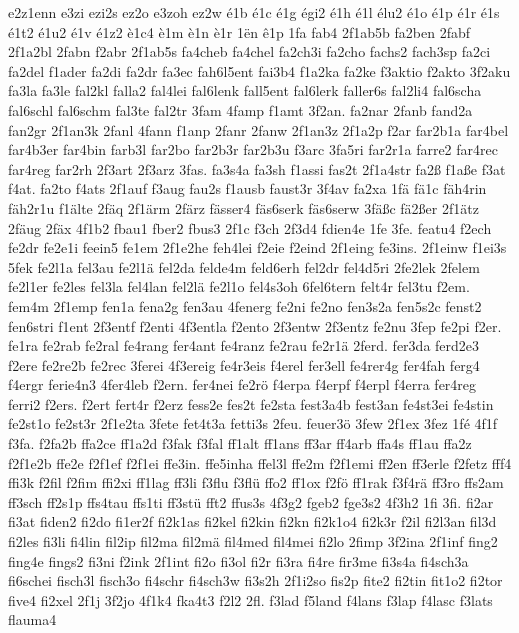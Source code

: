 {e2z1enn
e3zi
ezi2s
ez2o
e3zoh
ez2w
é1b
é1c
é1g
égi2
é1h
é1l
élu2
é1o
é1p
é1r
é1s
é1t2
é1u2
é1v
é1z2
è1c4
è1m
è1n
è1r
1ën
ê1p
1fa
fab4
2f1ab5b
fa2ben
2fabf
2f1a2bl
2fabn
f2abr
2f1ab5s
fa4cheb
fa4chel
fa2ch3i
fa2cho
fachs2
fach3sp
fa2ci
fa2del
f1ader
fa2di
fa2dr
fa3ec
fah6l5ent
fai3b4
f1a2ka
fa2ke
f3aktio
f2akto
3f2aku
fa3la
fa3le
fal2kl
falla2
fal4lei
fal6lenk
fall5ent
fal6lerk
faller6s
fal2li4
fal6scha
fal6schl
fal6schm
fal3te
fal2tr
3fam
4famp
f1amt
3f2an.
fa2nar
2fanb
fand2a
fan2gr
2f1an3k
2fanl
4fann
f1anp
2fanr
2fanw
2f1an3z
2f1a2p
f2ar
far2b1a
far4bel
far4b3er
far4bin
farb3l
far2bo
far2b3r
far2b3u
f3arc
3fa5ri
far2r1a
farre2
far4rec
far4reg
far2rh
2f3art
2f3arz
3fas.
fa3s4a
fa3sh
f1assi
fas2t
2f1a4str
fa2ß
f1aße
f3at
f4at.
fa2to
f4ats
2f1auf
f3aug
fau2s
f1ausb
faust3r
3f4av
fa2xa
1fä
fä1c
fäh4rin
fäh2r1u
f1älte
2fäq
2f1ärm
2färz
fässer4
fäs6serk
fäs6serw
3fäßc
fä2ßer
2f1ätz
2fäug
2fäx
4f1b2
fbau1
fber2
fbus3
2f1c
f3ch
2f3d4
fdien4e
1fe
3fe.
featu4
f2ech
fe2dr
fe2e1i
feein5
fe1em
2f1e2he
feh4lei
f2eie
f2eind
2f1eing
fe3ins.
2f1einw
f1ei3s
5fek
fe2l1a
fel3au
fe2l1ä
fel2da
felde4m
feld6erh
fel2dr
fel4d5ri
2fe2lek
2felem
fe2l1er
fe2les
fel3la
fel4lan
fel2lä
fe2l1o
fel4s3oh
6fel6tern
felt4r
fel3tu
f2em.
fem4m
2f1emp
fen1a
fena2g
fen3au
4fenerg
fe2ni
fe2no
fen3s2a
fen5s2c
fenst2
fen6stri
f1ent
2f3entf
f2enti
4f3entla
f2ento
2f3entw
2f3entz
fe2nu
3fep
fe2pi
f2er.
fe1ra
fe2rab
fe2ral
fe4rang
fer4ant
fe4ranz
fe2rau
fe2r1ä
2ferd.
fer3da
ferd2e3
f2ere
fe2re2b
fe2rec
3ferei
4f3ereig
fe4r3eis
f4erel
fer3ell
fe4rer4g
fer4fah
ferg4
f4ergr
ferie4n3
4fer4leb
f2ern.
fer4nei
fe2rö
f4erpa
f4erpf
f4erpl
f4erra
fer4reg
ferri2
f2ers.
f2ert
fert4r
f2erz
fess2e
fes2t
fe2sta
fest3a4b
fest3an
fe4st3ei
fe4stin
fe2st1o
fe2st3r
2f1e2ta
3fete
fet4t3a
fetti3s
2feu.
feuer3ö
3few
2f1ex
3fez
1fé
4f1f
f3fa.
f2fa2b
ffa2ce
ff1a2d
f3fak
f3fal
ff1alt
ff1ans
ff3ar
ff4arb
ffa4s
ff1au
ffa2z
f2f1e2b
ffe2e
f2f1ef
f2f1ei
ffe3in.
ffe5inha
ffel3l
ffe2m
f2f1emi
ff2en
ff3erle
f2fetz
fff4
ffi3k
f2fil
f2fim
ffi2xi
ff1lag
ff3li
f3flu
f3flü
ffo2
ff1ox
f2fö
ff1rak
f3f4rä
ff3ro
ffs2am
ff3sch
ff2s1p
ffs4tau
ffs1ti
ff3stü
fft2
ffus3s
4f3g2
fgeb2
fge3s2
4f3h2
1fi
3fi.
fi2ar
fi3at
fiden2
fi2do
fi1er2f
fi2k1as
fi2kel
fi2kin
fi2kn
fi2k1o4
fi2k3r
f2il
fi2l3an
fil3d
fi2les
fi3li
fi4lin
fil2ip
fil2ma
fil2mä
fil4med
fil4mei
fi2lo
2fimp
3f2ina
2f1inf
fing2
fing4e
fings2
fi3ni
f2ink
2f1int
fi2o
fi3ol
fi2r
fi3ra
fi4re
fir3me
fi3s4a
fi4sch3a
fi6schei
fisch3l
fisch3o
fi4schr
fi4sch3w
fi3s2h
2f1i2so
fis2p
fite2
fi2tin
fit1o2
fi2tor
five4
fi2xel
2f1j
3f2jo
4f1k4
fka4t3
f2l2
2fl.
f3lad
f5land
f4lans
f3lap
f4lasc
f3lats
flauma4
}
